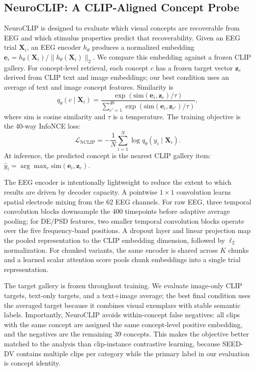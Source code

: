 \documentclass{article}
\begin{document}
\subsection{NeuroCLIP: A CLIP-Aligned Concept Probe}

NeuroCLIP is designed to evaluate which visual concepts are recoverable from
EEG and which stimulus properties predict that recoverability. Given an EEG trial
$\mathbf{X}_i$, an EEG encoder $h_\theta$ produces a normalized embedding
$\mathbf{e}_i = h_\theta(\mathbf{X}_i)/\|h_\theta(\mathbf{X}_i)\|_2$. We compare
this embedding against a frozen CLIP gallery. For concept-level retrieval, each
concept $c$ has a frozen target vector $\mathbf{z}_c$ derived from CLIP text and
image embeddings; our best condition uses an average of text and image concept
features. Similarity is
\begin{equation}
    q_\theta(c \mid \mathbf{X}_i)
    =
    \frac{\exp(\mathrm{sim}(\mathbf{e}_i,\mathbf{z}_c)/\tau)}
    {\sum_{c'=1}^{40}\exp(\mathrm{sim}(\mathbf{e}_i,\mathbf{z}_{c'})/\tau)},
\end{equation}
where $\mathrm{sim}$ is cosine similarity and $\tau$ is a temperature.
The training objective is the 40-way InfoNCE loss:
\begin{equation}
    \mathcal{L}_{\mathrm{NCLIP}}
    =
    -\frac{1}{N}\sum_{i=1}^{N}\log q_\theta(y_i \mid \mathbf{X}_i).
\end{equation}
At inference, the predicted concept is the nearest CLIP gallery item:
$\hat{y}_i=\arg\max_c \mathrm{sim}(\mathbf{e}_i,\mathbf{z}_c)$.

The EEG encoder is intentionally lightweight to reduce the extent to which
results are driven by decoder capacity. A pointwise
$1{\times}1$ convolution learns spatial electrode mixing
from the 62 EEG channels. For raw EEG, three temporal convolution blocks
downsample the 400 timepoints before adaptive average pooling; for DE/PSD
features, two smaller temporal convolution blocks operate over the five
frequency-band positions. A dropout layer and linear projection map the pooled
representation to the CLIP embedding dimension, followed by $\ell_2$
normalization. For chunked variants, the same encoder is shared across $K$
chunks and a learned scalar attention score pools chunk embeddings into a
single trial representation.

The target gallery is frozen throughout training. We evaluate image-only CLIP
targets, text-only targets, and a text+image average; the best final condition
uses the averaged target because it combines visual exemplars with stable
semantic labels. Importantly, NeuroCLIP avoids within-concept false negatives:
all clips with the same concept are assigned the same concept-level positive
embedding, and the negatives are the remaining 39 concepts. This makes the
objective better matched to the analysis than clip-instance contrastive
learning, because SEED-DV contains multiple clips per category while the primary
label in our evaluation is concept identity.
\end{document}
